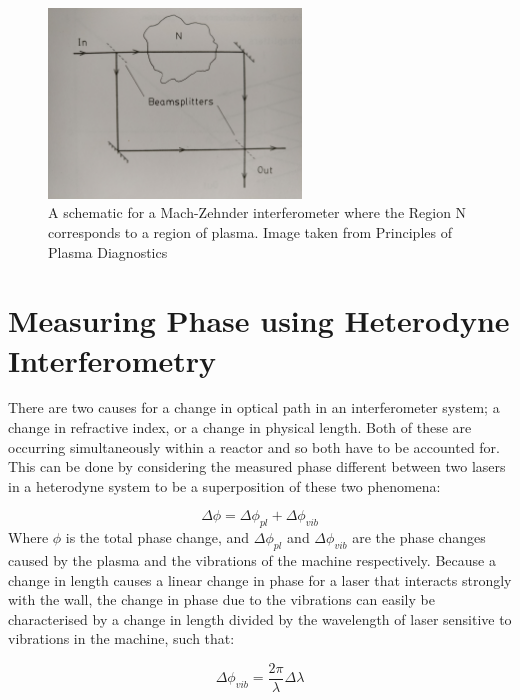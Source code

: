 \documentclass[12pt,a4paper,oneside]{report}
\begin{document}
\begin{figure}[H]
\includegraphics[width=0.6\textwidth, center,angle=0]{Images/mzint.jpg}
\caption{A schematic for a Mach-Zehnder interferometer where the Region N corresponds to a region of plasma. Image taken from Principles of Plasma Diagnostics \cite[p.~97]{Hutchinson2005PrinciplesDiagnostics}}
\label{mzint}
\end{figure}

	\section{Measuring Phase using Heterodyne Interferometry}
There are two causes for a change in optical path in an interferometer system; a change in refractive index, or a change in physical length. Both of these are occurring simultaneously within a reactor and so both have to be accounted for. This can be done by considering the measured phase different between two lasers in a heterodyne system to be a superposition of these two phenomena:

\begin{equation}
	\Delta\phi = \Delta\phi_{pl} + \Delta\phi_{vib}
	\label{eq:superposphasediff}
\end{equation}
Where $\phi$ is the total phase change, and $\Delta\phi_{pl}$ and $\Delta\phi_{vib}$ are the phase changes caused by the plasma and the vibrations of the machine respectively. Because a change in length causes a linear change in phase for a laser that interacts strongly with the wall, the change in phase due to the vibrations can easily be characterised by a change in length divided by the wavelength of laser sensitive to vibrations in the machine, such that:

\begin{equation}
	\Delta\phi_{vib} = \frac{2\pi}{\lambda} \Delta\lambda
	\label{eq:vibphasediff}
\end{equation}
\end{document}
